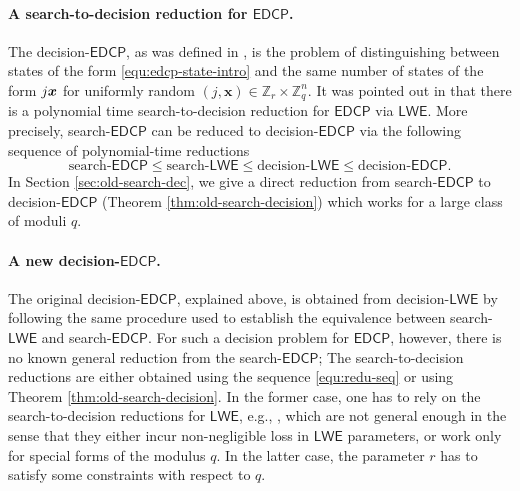 \documentclass[11pt]{article}
\theoremstyle{plain}
\theoremstyle{definition}
\let\ket\relax
\DeclarePairedDelimiter{\ket}{\lvert}{\rangle}
\def\Z{\mathbb{Z}}
\def\lwe{\mathsf{LWE}}
\def\edcp{\mathsf{EDCP}}
\begin{document}
\paragraph{A search-to-decision reduction for $\edcp$.}
The decision-$\edcp$, as was defined in \cite{brakerski2018learning}, is the problem of distinguishing between states of the form \eqref{equ:edcp-state-intro} and the same number of states of the form $\ket{j}\ket{\bm{x}}$ for uniformly random $(j, \bm{x}) \in \Z_r \times \Z_q^n$. It was pointed out in \cite{brakerski2018learning} that there is a polynomial time search-to-decision reduction for $\edcp$ via $\lwe$. More precisely, search-$\edcp$ can be reduced to decision-$\edcp$ via the following sequence of polynomial-time reductions
\begin{equation}
    \label{equ:redu-seq}
    \text{search-}\edcp \le \text{search-}\lwe \le \text{decision-}\lwe \le \text{decision-}\edcp.
\end{equation}
In Section \ref{sec:old-search-dec}, we give a direct reduction from search-$\edcp$ to decision-$\edcp$ (Theorem \ref{thm:old-search-decision}) which works for a large class of moduli $q$.

\paragraph{A new decision-$\edcp$.}
The original decision-$\edcp$, explained above, is obtained from decision-$\lwe$ by following the same procedure used to establish the equivalence between search-$\lwe$ and search-$\edcp$. For such a decision problem for $\edcp$, however, there is no known general reduction from the search-$\edcp$; The search-to-decision reductions are either obtained using the sequence \eqref{equ:redu-seq} or using Theorem \ref{thm:old-search-decision}. In the former case, one has to rely on the search-to-decision reductions for $\lwe$, e.g., \cite{regev2009lattices, brakerski2013classical, micciancio2012trapdoors}, which are not general enough in the sense that they either incur non-negligible loss in $\lwe$ parameters, or work only for special forms of the modulus $q$. In the latter case, the parameter $r$ has to satisfy some constraints with respect to $q$.
\end{document}
